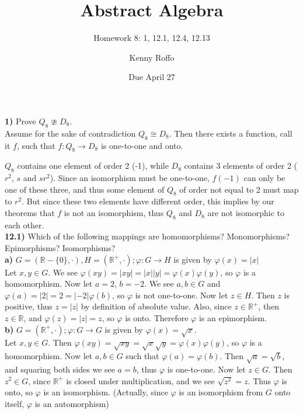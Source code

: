\documentclass{scrartcl}
\title{Abstract Algebra}
\subtitle{Homework 8: 1, 12.1, 12.4, 12.13}
\author{Kenny Roffo}
\date{Due April 27}
\begin{document}
\maketitle
\textbf{1)} Prove $Q_8 \ncong D_8$.\\

Assume for the sake of contradiction $Q_8 \cong D_8$. Then there exists a
function, call it $f$, such that $f : Q_8 \rightarrow D_8$ is one-to-one and
onto.

$Q_8$ contains one element of order 2 (-1), while $D_8$ contains 3 elements of
order 2 ($r^2$, $s$ and $sr^2$). Since an isomorphism must be one-to-one, $f(-1)$ can
only be one of these three, and thus some element of $Q_8$ of order not equal to
2 must map to $r^2$. But since these two elements have different order, this
implies by our theorems that $f$ is not an isomorphism, thus $Q_8$ and $D_8$ are
not isomorphic to each other.\\

\textbf{12.1)} Which of the following mappings are homomorphisms? Monomorphisms?
Epimorphisms? Isomorphisms?\\

\textbf{a)} $G = (\mathbb{R}-\{0\},\cdot),H=(\mathbb{R}^+,\cdot); 
             \varphi : G \rightarrow H$ is given by $\varphi(x)=|x|$\\

Let $x,y \in G$. We see $\varphi(xy)=|xy|=|x||y|=\varphi(x)\varphi(y)$, so
$\varphi$ is a homomorphism. Now let $a=2$, $b=-2$. We see $a,b \in G$ and 
$\varphi(a)=|2|=2=|-2|\varphi(b)$, so $\varphi$ is not one-to-one. Now let 
$z \in H$. Then $z$ is positive, thus $z=|z|$ by definition of absolute value.
Also, since $z \in \mathbb{R^+}$, then $z \in \mathbb{R}$, and
$\varphi(z)=|z|=z$, so $\varphi$ is onto. Therefore $\varphi$ is an epimorphism.
\\

\textbf{b)} $G=(\mathbb{R}^+,\cdot); \varphi:G \rightarrow G$ is given by
            $\varphi(x) = \sqrt{x}$.\\

Let $x,y \in G$. Then $\varphi(xy)=\sqrt{xy}=\sqrt{x}\sqrt{y}
=\varphi(x)\varphi(y)$, so $\varphi$ is a homomorphism. Now let $a,b \in G$
such that $\varphi(a)=\varphi(b)$. Then $\sqrt{a}=\sqrt{b}$, and squaring both
sides we see $a=b$, thus $\varphi$ is one-to-one. Now let $z \in G$.
Then $z^2 \in G$, since $\mathbb{R}^+$ is closed under multiplication, and we
see $\sqrt{z^2}=z$. Thus $\varphi$ is onto, so $\varphi$ is an isomorphism.
(Actually, since $\varphi$ is an isomorphism from $G$ onto itself, $\varphi$ is
an automorphism)\\
\end{document}
